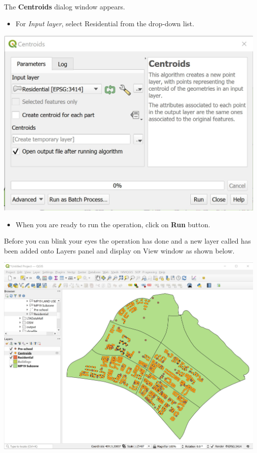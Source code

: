 \documentclass[
  letterpaper,
  DIV=11,
  numbers=noendperiod]{scrreprt}
\providecommand{\tightlist}{%
  \setlength{\itemsep}{0pt}\setlength{\parskip}{0pt}}\usepackage{longtable,booktabs,array}
\begin{document}
The \textbf{Centroids} dialog window appears.

\begin{itemize}
\tightlist
\item
  For \emph{Input layer}, select Residential from the drop-down list.
\end{itemize}

\includegraphics{./img04/image107.jpg}

\begin{itemize}
\tightlist
\item
  When you are ready to run the operation, click on \textbf{Run} button.
\end{itemize}

Before you can blink your eyes the operation has done and a new layer
called has been added onto Layers panel and display on View window as
shown below.

\includegraphics{./img04/image108.jpg}
\end{document}
